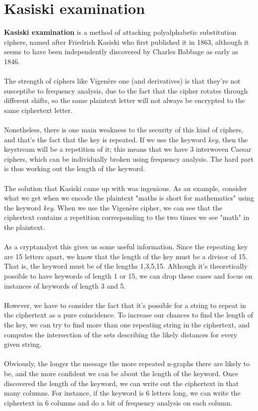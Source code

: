 \documentclass[Lau,binding=0.6cm,oneside]{sapthesis}
\begin{document}
\section{Kasiski examination}
\textbf{Kasiski examination} is a method of attacking polyalphabetic substitution ciphers, named after Friedrich Kasiski who first published it in 1863, although it seems to have been independently discovered by Charles Babbage as early as 1846.\\\\
The strength of ciphers like Vigenère one (and derivatives) is that they're not susceptibe to frequency analysis, due to the fact that the cipher rotates through different shifts, so the same plaintext letter will not always be encrypted to the same ciphertext letter.\\\\
Nonetheless, there is one main weakness to the security of this kind of ciphers, and that's the fact that the key is repeated. If we use the keyword \textit{key}, then the keystream will be a repetition of it; this means that we have 3 interwoven Caesar ciphers, which can be individually broken using frequency analysis. The hard part is thus working out the length of the keyword.\\\\
The solution that Kasiski came up with was ingenious. As an example, consider what we get when we encode the plaintext "maths is short for mathematics" using the keyword \textit{key}. When we use the Vigenère cipher, we can see that the ciphertext contains a repetition corresponding to the two times we see "math" in the plaintext.\\\\
As a cryptanalyst this gives us some useful information. Since the repeating key are 15 letters apart, we know that the length of the key must be a divisor of 15. That is, the keyword must be of the lengths 1,3,5,15. Although it's theoretically possible to have keywords of length 1 or 15, we can drop these cases and focus on instances of keywords of length 3 and 5.\\\\
However, we have to consider the fact that it's possible for a string to repeat in the ciphertext as a pure coincidence. To increase our chances to find the length of the key, we can try to find more than one repeating string in the ciphertext, and computes the intersection of the sets describing the likely distances for every given string.\\\\
Obviously, the longer the message the more repeated n-graphs there are likely to be, and the more confident we can be about the length of the keyword. Once discovered the length of the keyword, we can write out the ciphertext in that many columns. For instance, if the keyword is 6 letters long, we can write the ciphertext in 6 columns and do a bit of frequency analysis on each column.\\\\
\end{document}
